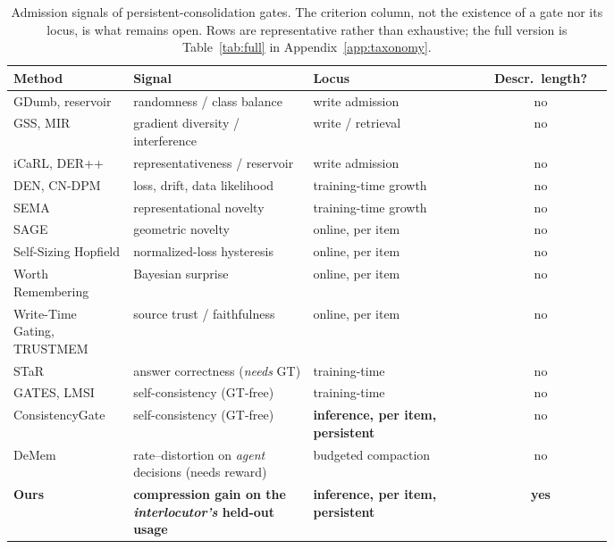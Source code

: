 \documentclass[11pt]{article}
\begin{document}
\begin{table}[t]
\centering\small
\caption{Admission signals of persistent-consolidation gates. The criterion column, not the
existence of a gate nor its locus, is what remains open. Rows are representative rather than
exhaustive; the full version is Table~\ref{tab:full} in Appendix~\ref{app:taxonomy}.}
\label{tab:taxonomy}
\setlength{\tabcolsep}{4pt}
\begin{tabular}{@{}p{0.20\linewidth}p{0.30\linewidth}p{0.28\linewidth}c@{}}
\toprule
\textbf{Method} & \textbf{Signal} & \textbf{Locus} & \textbf{Descr.\ length?} \\
\midrule
GDumb, reservoir & randomness / class balance & write admission & no \\
GSS, MIR         & gradient diversity / interference & write / retrieval & no \\
iCaRL, DER++     & representativeness / reservoir & write admission & no \\
DEN, CN-DPM      & loss, drift, data likelihood & training-time growth & no \\
SEMA             & representational novelty & training-time growth & no \\
SAGE             & geometric novelty & online, per item & no \\
Self-Sizing Hopfield & normalized-loss hysteresis & online, per item & no \\
Worth Remembering & Bayesian surprise & online, per item & no \\
Write-Time Gating, TRUSTMEM & source trust / faithfulness & online, per item & no \\
STaR             & answer correctness (\emph{needs} GT) & training-time & no \\
GATES, LMSI      & self-consistency (GT-free) & training-time & no \\
ConsistencyGate  & self-consistency (GT-free) & \textbf{inference, per item, persistent} & no \\
DeMem            & rate--distortion on \emph{agent} decisions (needs reward) & budgeted compaction & no \\[2pt]
\midrule
\textbf{Ours} & \textbf{compression gain on the \emph{interlocutor's} held-out usage}
              & \textbf{inference, per item, persistent} & \textbf{yes} \\
\bottomrule
\end{tabular}
\end{table}

\end{document}

